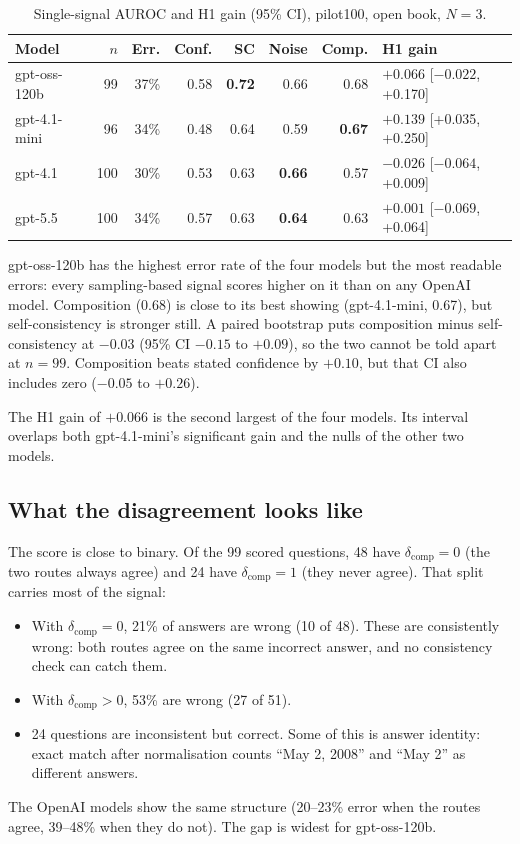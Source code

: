 \documentclass[11pt]{article}
\begin{document}
\begin{table}[h]
\centering
\small
\caption{Single-signal AUROC and H1 gain (95\% CI), pilot100, open book, $N=3$.}
\label{tab:h1}
\begin{tabular}{lrrrrrrl}
\toprule
Model & $n$ & Err. & Conf. & SC & Noise & Comp. & H1 gain \\
\midrule
gpt-oss-120b & 99 & 37\% & 0.58 & \textbf{0.72} & 0.66 & 0.68 & $+0.066$ [$-0.022$, +0.170] \\
gpt-4.1-mini & 96 & 34\% & 0.48 & 0.64 & 0.59 & \textbf{0.67} & $\mathbf{+0.139}$ [+0.035, +0.250] \\
gpt-4.1 & 100 & 30\% & 0.53 & 0.63 & \textbf{0.66} & 0.57 & $-0.026$ [$-0.064$, +0.009] \\
gpt-5.5 & 100 & 34\% & 0.57 & 0.63 & \textbf{0.64} & 0.63 & $+0.001$ [$-0.069$, +0.064] \\
\bottomrule
\end{tabular}
\end{table}

gpt-oss-120b has the highest error rate of the four models but the most readable errors:
every sampling-based signal scores higher on it than on any OpenAI model. Composition
(0.68) is close to its best showing (gpt-4.1-mini, 0.67), but self-consistency is stronger
still. A paired bootstrap puts composition minus self-consistency at $-0.03$ (95\% CI
$-0.15$ to $+0.09$), so the two cannot be told apart at $n = 99$. Composition beats stated
confidence by $+0.10$, but that CI also includes zero ($-0.05$ to $+0.26$).

The H1 gain of $+0.066$ is the second largest of the four models. Its interval overlaps
both gpt-4.1-mini's significant gain and the nulls of the other two models.

\subsection{What the disagreement looks like}
The score is close to binary. Of the 99 scored questions, 48 have $\delta_{\text{comp}} = 0$
(the two routes always agree) and 24 have $\delta_{\text{comp}} = 1$ (they never agree).
That split carries most of the signal:
\begin{itemize}
  \item With $\delta_{\text{comp}} = 0$, 21\% of answers are wrong (10 of 48). These are
        consistently wrong: both routes agree on the same incorrect answer, and no
        consistency check can catch them.
  \item With $\delta_{\text{comp}} > 0$, 53\% are wrong (27 of 51).
  \item 24 questions are inconsistent but correct. Some of this is answer identity: exact
        match after normalisation counts ``May 2, 2008'' and ``May 2'' as different
        answers.
\end{itemize}
The OpenAI models show the same structure (20--23\% error when the routes agree,
39--48\% when they do not). The gap is widest for gpt-oss-120b.
\end{document}
